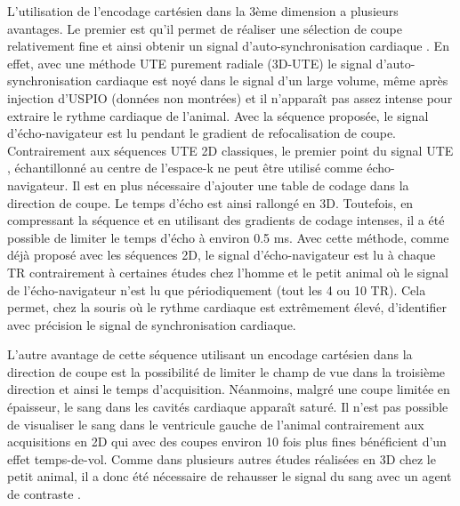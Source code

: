 L’utilisation de l’encodage cartésien dans la 3ème dimension a plusieurs avantages. Le premier est qu’il permet de réaliser une sélection de coupe relativement fine et ainsi obtenir un signal d’auto-synchronisation cardiaque \cite{crowe2004automated}. En effet, avec une méthode UTE purement radiale (3D-UTE) le signal d’auto-synchronisation cardiaque est noyé dans le signal d’un large volume, même après injection d’USPIO (données non montrées) et il n’apparaît pas assez intense pour extraire le rythme cardiaque de l’animal. Avec la séquence proposée, le signal d’écho-navigateur est lu pendant le gradient de refocalisation de coupe. Contrairement aux séquences UTE 2D classiques, le premier point du signal UTE \cite{Hoerr:2013gf,Motaal:2015aa}, échantillonné au centre de l’espace-k ne peut être utilisé comme écho-navigateur. Il est en plus nécessaire d’ajouter une table de codage dans la direction de coupe. Le temps d’écho est ainsi rallongé en 3D. Toutefois, en compressant la séquence et en utilisant des gradients de codage intenses, il a été possible de limiter le temps d’écho à environ 0.5 ms. Avec cette méthode, comme déjà proposé avec les séquences 2D, le signal d’écho-navigateur est lu à chaque TR contrairement à certaines études chez l’homme \cite{coppo2014free} et le petit animal \cite{kramer2015self} où le signal de l’écho-navigateur n’est lu que périodiquement (tout les 4 ou 10 TR). Cela permet, chez la souris où le rythme cardiaque est extrêmement élevé, d’identifier avec précision le signal de synchronisation cardiaque. 
\medskip

L’autre avantage de cette séquence utilisant un encodage cartésien dans la direction de coupe est la possibilité de limiter le champ de vue dans la troisième direction et ainsi le temps d’acquisition. Néanmoins, malgré une coupe limitée en épaisseur, le sang dans les cavités cardiaque apparaît saturé. Il n’est pas possible de visualiser le sang dans le ventricule gauche de l’animal contrairement aux acquisitions en 2D qui avec des coupes environ 10 fois plus fines bénéficient d'un effet temps-de-vol. Comme dans plusieurs autres études réalisées en 3D chez le petit animal, il a donc été nécessaire de rehausser le signal du sang avec un agent de contraste \cite{Bucholz:2008uq,Bucholz:2010aa}. 

